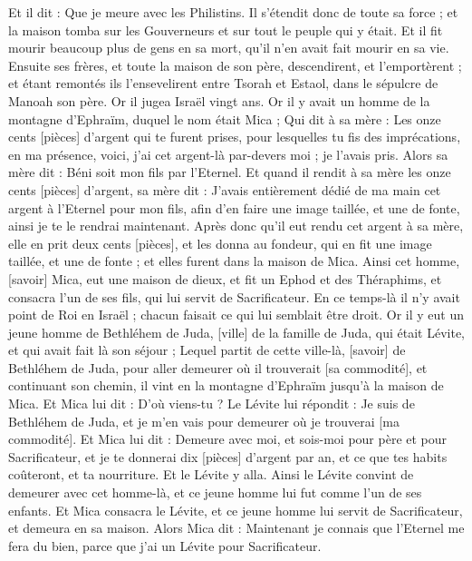 \begin{multicols}{2}
Et il dit : Que je meure avec les Philistins. Il s'étendit donc de toute sa force ; et la maison tomba sur les Gouverneurs et sur tout le peuple qui y était. Et il fit mourir beaucoup plus de gens en sa mort, qu'il n'en avait fait mourir en sa vie.
Ensuite ses frères, et toute la maison de son père, descendirent, et l'emportèrent ; et étant remontés ils l'ensevelirent entre Tsorah et Estaol, dans le sépulcre de Manoah son père. Or il jugea Israël vingt ans.
\VerseOne{}Or il y avait un homme de la montagne d'Ephraïm, duquel le nom était Mica ;
Qui dit à sa mère : Les onze cents [pièces] d'argent qui te furent prises, pour lesquelles tu fis des imprécations, en ma présence, voici, j'ai cet argent-là par-devers moi ; je l'avais pris. Alors sa mère dit : Béni soit mon fils par l'Eternel.
Et quand il rendit à sa mère les onze cents [pièces] d'argent, sa mère dit : J'avais entièrement dédié de ma main cet argent à l'Eternel pour mon fils, afin d'en faire une image taillée, et une de fonte, ainsi je te le rendrai maintenant.
Après donc qu'il eut rendu cet argent à sa mère, elle en prit deux cents [pièces], et les donna au fondeur, qui en fit une image taillée, et une de fonte ; et elles furent dans la maison de Mica.
Ainsi cet homme, [savoir] Mica, eut une maison de dieux, et fit un Ephod et des Théraphims, et consacra l'un de ses fils, qui lui servit de Sacrificateur.
En ce temps-là il n'y avait point de Roi en Israël ; chacun faisait ce qui lui semblait être droit.
Or il y eut un jeune homme de Bethléhem de Juda, [ville] de la famille de Juda, qui était Lévite, et qui avait fait là son séjour ;
Lequel partit de cette ville-là, [savoir] de Bethléhem de Juda, pour aller demeurer où il trouverait [sa commodité], et continuant son chemin, il vint en la montagne d'Ephraïm jusqu'à la maison de Mica.
Et Mica lui dit : D'où viens-tu ? Le Lévite lui répondit : Je suis de Bethléhem de Juda, et je m'en vais pour demeurer où je trouverai [ma commodité].
Et Mica lui dit : Demeure avec moi, et sois-moi pour père et pour Sacrificateur, et je te donnerai dix [pièces] d'argent par an, et ce que tes habits coûteront, et ta nourriture. Et le Lévite y alla.
Ainsi le Lévite convint de demeurer avec cet homme-là, et ce jeune homme lui fut comme l'un de ses enfants.
Et Mica consacra le Lévite, et ce jeune homme lui servit de Sacrificateur, et demeura en sa maison.
Alors Mica dit : Maintenant je connais que l'Eternel me fera du bien, parce que j'ai un Lévite pour Sacrificateur.

\end{multicols}
